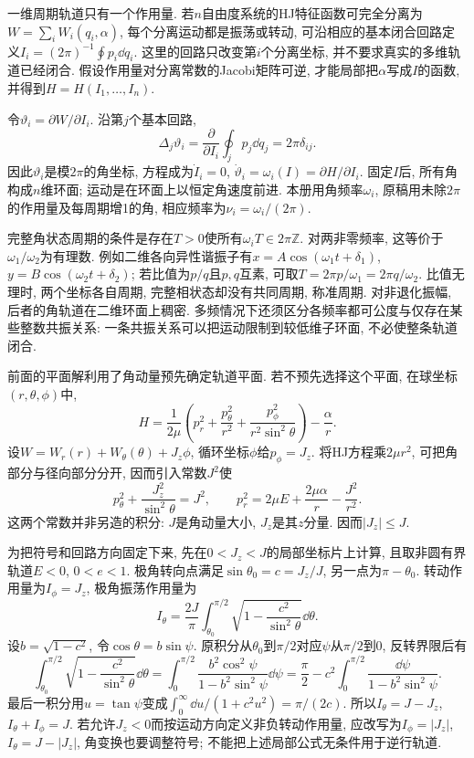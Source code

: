 一维周期轨道只有一个作用量. 若$n$自由度系统的HJ特征函数可完全分离为$W=\sum_iW_i(q_i,\alpha)$, 每个分离运动都是振荡或转动, 可沿相应的基本闭合回路定义$I_i=(2\pi)^{-1}\oint p_i\dd q_i$. 这里的回路只改变第$i$个分离坐标, 并不要求真实的多维轨道已经闭合. 假设作用量对分离常数的Jacobi矩阵可逆, 才能局部把$\alpha$写成$I$的函数, 并得到$H=H(I_1,\ldots,I_n)$.

令$\vartheta_i=\partial W/\partial I_i$. 沿第$j$个基本回路,
\[
\Delta_j\vartheta_i
=\frac{\partial}{\partial I_i}\oint_j p_j\dd q_j
=2\pi\delta_{ij}.
\]
因此$\vartheta_i$是模$2\pi$的角坐标, 方程成为$\dot I_i=0$, $\dot\vartheta_i=\omega_i(I)=\partial H/\partial I_i$. 固定$I$后, 所有角构成$n$维环面; 运动是在环面上以恒定角速度前进. 本册用角频率$\omega_i$, 原稿用未除$2\pi$的作用量及每周期增1的角, 相应频率为$\nu_i=\omega_i/(2\pi)$.

完整角状态周期的条件是存在$T>0$使所有$\omega_iT\in2\pi\mathbb Z$. 对两非零频率, 这等价于$\omega_1/\omega_2$为有理数. 例如二维各向异性谐振子有$x=A\cos(\omega_1t+\delta_1)$, $y=B\cos(\omega_2t+\delta_2)$; 若比值为$p/q$且$p,q$互素, 可取$T=2\pi p/\omega_1=2\pi q/\omega_2$. 比值无理时, 两个坐标各自周期, 完整相状态却没有共同周期, 称准周期. 对非退化振幅, 后者的角轨道在二维环面上稠密. 多频情况下还须区分各频率都可公度与仅存在某些整数共振关系: 一条共振关系可以把运动限制到较低维子环面, 不必使整条轨道闭合.

前面的平面解利用了角动量预先确定轨道平面. 若不预先选择这个平面, 在球坐标$(r,\theta,\phi)$中,
\[
H=\frac1{2\mu}\left(p_r^2+\frac{p_\theta^2}{r^2}
+\frac{p_\phi^2}{r^2\sin^2\theta}\right)-\frac\alpha r.
\]
设$W=W_r(r)+W_\theta(\theta)+J_z\phi$, 循环坐标$\phi$给$p_\phi=J_z$. 将HJ方程乘$2\mu r^2$, 可把角部分与径向部分分开, 因而引入常数$J^2$使
\[
p_\theta^2+\frac{J_z^2}{\sin^2\theta}=J^2,
\qquad p_r^2=2\mu E+\frac{2\mu\alpha}{r}-\frac{J^2}{r^2}.
\]
这两个常数并非另造的积分: $J$是角动量大小, $J_z$是其$z$分量. 因而$|J_z|\le J$.

为把符号和回路方向固定下来, 先在$0<J_z<J$的局部坐标片上计算, 且取非圆有界轨道$E<0$, $0<e<1$. 极角转向点满足$\sin\theta_0=c=J_z/J$, 另一点为$\pi-\theta_0$. 转动作用量为$I_\phi=J_z$, 极角振荡作用量为
\[
I_\theta=\frac{2J}{\pi}\int_{\theta_0}^{\pi/2}
\sqrt{1-\frac{c^2}{\sin^2\theta}}\dd\theta.
\]
设$b=\sqrt{1-c^2}$, 令$\cos\theta=b\sin\psi$. 原积分从$\theta_0$到$\pi/2$对应$\psi$从$\pi/2$到0, 反转界限后有
\[
\int_{\theta_0}^{\pi/2}\sqrt{1-\frac{c^2}{\sin^2\theta}}\dd\theta
=\int_0^{\pi/2}\frac{b^2\cos^2\psi}{1-b^2\sin^2\psi}\dd\psi
=\frac\pi2-c^2\int_0^{\pi/2}\frac{\dd\psi}{1-b^2\sin^2\psi}.
\]
最后一积分用$u=\tan\psi$变成$\int_0^\infty\dd u/(1+c^2u^2)=\pi/(2c)$. 所以$I_\theta=J-J_z$, $I_\theta+I_\phi=J$. 若允许$J_z<0$而按运动方向定义非负转动作用量, 应改写为$I_\phi=|J_z|$, $I_\theta=J-|J_z|$, 角变换也要调整符号; 不能把上述局部公式无条件用于逆行轨道.

